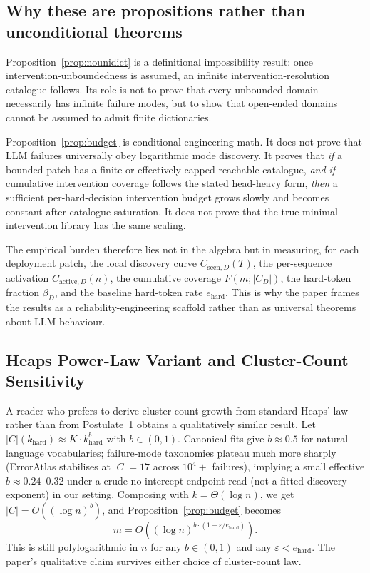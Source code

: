 \documentclass{article}
\theoremstyle{taeplain}
\theoremstyle{taedefn}
\newcommand{\teApprox}{\ensuremath{\approx}}
\begin{document}
\subsection{Why these are propositions rather than unconditional theorems}
\label{app:why-propositions}

Proposition~\ref{prop:nounidict} is a definitional impossibility result: once intervention-unboundedness is assumed, an infinite intervention-resolution catalogue follows. Its role is not to prove that every unbounded domain necessarily has infinite failure modes, but to show that open-ended domains cannot be assumed to admit finite dictionaries.

Proposition~\ref{prop:budget} is conditional engineering math. It does not prove that LLM failures universally obey logarithmic mode discovery. It proves that \emph{if} a bounded patch has a finite or effectively capped reachable catalogue, \emph{and if} cumulative intervention coverage follows the stated head-heavy form, \emph{then} a sufficient per-hard-decision intervention budget grows slowly and becomes constant after catalogue saturation. It does not prove that the true minimal intervention library has the same scaling.

The empirical burden therefore lies not in the algebra but in measuring, for each deployment patch, the local discovery curve $C_{\text{seen},D}(T)$, the per-sequence activation $C_{\text{active},D}(n)$, the cumulative coverage $F(m; |C_D|)$, the hard-token fraction $\beta_D$, and the baseline hard-token rate $e_{\text{hard}}$. This is why the paper frames the results as a reliability-engineering scaffold rather than as universal theorems about LLM behaviour.

\subsection{Heaps Power-Law Variant and Cluster-Count Sensitivity}
\label{app:heaps}

A reader who prefers to derive cluster-count growth from standard Heaps' law rather than from Postulate~1 obtains a qualitatively similar result. Let $|C|(k_{\text{hard}}) \teApprox K \cdot k_{\text{hard}}^{b}$ with $b \in (0, 1)$. Canonical fits give $b \teApprox 0.5$ for natural-language vocabularies; failure-mode taxonomies plateau much more sharply (ErrorAtlas stabilises at $|C| = 17$ across $10^4{+}$ failures), implying a small effective $b \teApprox 0.24$--$0.32$ under a crude no-intercept endpoint read (not a fitted discovery exponent) in our setting. Composing with $k = \Theta(\log n)$, we get $|C| = O((\log n)^{b})$, and Proposition~\ref{prop:budget} becomes
\[
m = O\!\left((\log n)^{b \cdot (1 - \varepsilon / e_{\text{hard}})}\right).
\]
This is still polylogarithmic in $n$ for any $b \in (0, 1)$ and any $\varepsilon < e_{\text{hard}}$. The paper's qualitative claim survives either choice of cluster-count law.
\end{document}
